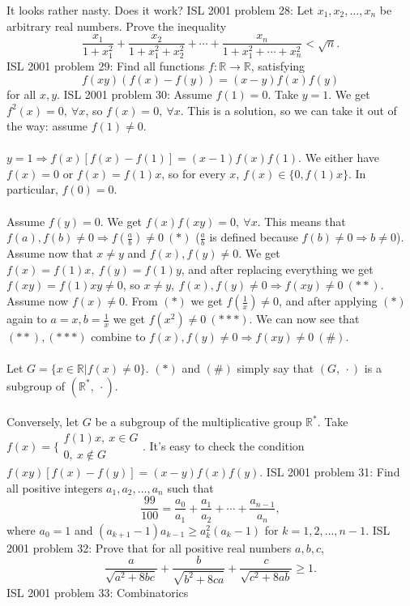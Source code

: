 It looks rather nasty. Does it work? 
ISL 2001 problem 28:  Let $x_1,x_2,\ldots,x_n$ be arbitrary real numbers. Prove the inequality
\[
\frac{x_1}{1+x_1^2} + \frac{x_2}{1+x_1^2 + x_2^2} + \cdots +
\frac{x_n}{1 + x_1^2 + \cdots + x_n^2} < \sqrt{n}.
\] 
ISL 2001 problem 29:  Find all functions $f: \mathbb{R} \rightarrow \mathbb{R}$, satisfying
\[ f(xy)(f(x) - f(y)) = (x-y)f(x)f(y) \]
for all $x,y$. 
ISL 2001 problem 30:  Assume $f(1)=0$. Take $y=1$. We get $f^2(x)=0,\ \forall x$, so $f(x)=0,\ \forall x$. This is a solution, so we can take it out of the way: assume $f(1)\ne 0$. \\\\
$y=1\Rightarrow f(x)[f(x)-f(1)]=(x-1)f(x)f(1)$. We either have $f(x)=0$ or $f(x)=f(1)x$, so for every $x$, $f(x)\in\{0,f(1)x\}$. In particular, $f(0)=0$. \\\\
Assume $f(y)=0$. We get $f(x)f(xy)=0,\ \forall x$. This means that $f(a),f(b)\ne 0\Rightarrow f(\frac ab)\ne 0\ (*)$ ($\frac ab$ is defined because $f(b)\ne 0\Rightarrow b\ne 0$). Assume now that $x\ne y$ and $f(x),f(y)\ne 0$. We get $f(x)=f(1)x,\ f(y)=f(1)y$, and after replacing everything we get $f(xy)=f(1)xy\ne 0$, so $x\ne y,\ f(x),f(y)\ne 0\Rightarrow f(xy)\ne 0\ (**)$. Assume now $f(x)\ne 0$. From $(*)$ we get $f(\frac 1x)\ne 0$, and after applying $(*)$ again to $a=x,b=\frac 1x$ we get $f(x^2)\ne 0\ (***)$. We can now see that $(**),(***)$ combine to $f(x),f(y)\ne 0\Rightarrow f(xy)\ne 0\ (\#)$. \\\\
Let $G=\{x\in\mathbb R|f(x)\ne 0\}$. $(*)$ and $(\#)$ simply say that $(G,\ \cdot)$ is a subgroup of $(\mathbb R^*,\ \cdot)$. \\\\
Conversely, let $G$ be a subgroup of the multiplicative group $\mathbb R^*$. Take $f(x)=\{
\begin{array}{c}f(1)x,\ x\in G\\0,\ x\not \in G\end{array}
$. It's easy to check the condition $f(xy)[f(x)-f(y)]=(x-y)f(x)f(y)$. 
ISL 2001 problem 31:  Find all positive integers $a_1, a_2, \ldots, a_n$ such that
\[ \frac{99}{100} = \frac{a_0}{a_1} + \frac{a_1}{a_2} + \cdots +
\frac{a_{n-1}}{a_n}, \]
where $a_0 = 1$ and $(a_{k+1}-1)a_{k-1} \geq a_k^2(a_k - 1)$ for $k = 1,2,\ldots,n-1$. 
ISL 2001 problem 32:  Prove that for all positive real numbers $a,b,c$,
\[ \frac{a}{\sqrt{a^2 + 8bc}} + \frac{b}{\sqrt{b^2 + 8ca}} + \frac{c}{\sqrt{c^2 + 8ab}} \geq 1. \] 
ISL 2001 problem 33:  Combinatorics 

